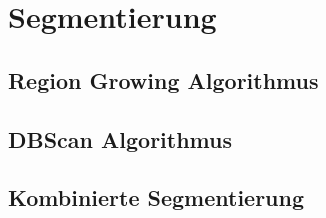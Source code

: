 \chapter{Segmentierung}
\section{Region Growing Algorithmus}
\section{DBScan Algorithmus}
\section{Kombinierte Segmentierung}
